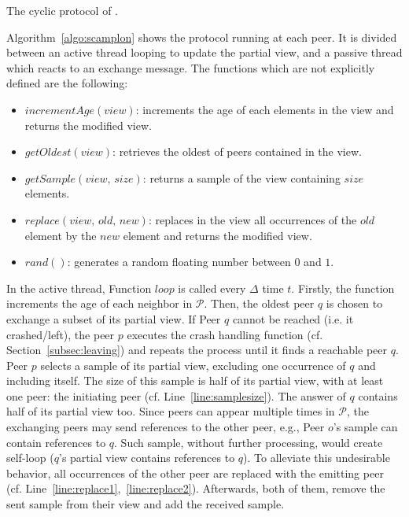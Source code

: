 \begin{algorithm}[h]
  
  \caption{\label{algo:scamplon}The cyclic protocol of \SPRAY.}
\end{algorithm}

Algorithm~\ref{algo:scamplon} shows the \SPRAY protocol running at each
peer. It is divided between an active thread looping to update the partial
view, and a passive thread which reacts to an exchange message. The functions
which are not explicitly defined are the following:
\begin{itemize}
\item $incrementAge(view)$: increments the age of each elements in the view
  and returns the modified view.
\item $getOldest(view)$: retrieves the oldest of peers contained in the view.
\item $getSample(view, \, size)$: returns a sample of the view containing
  $size$ elements.
\item $replace(view,\,old,\,new)$: replaces in the view all occurrences of
  the $old$ element by the $new$ element and returns the modified view.
\item $rand()$: generates a random floating number between $0$ and $1$.
\end{itemize}

In the active thread, Function $loop$ is called every $\Delta$ time
$t$. Firstly, the function increments the age of each neighbor in
$\mathcal{P}$. Then, the oldest peer $q$ is chosen to exchange a subset of its
partial view. If Peer $q$ cannot be reached (i.e. it crashed/left), the peer
$p$ executes the crash handling function (cf. Section~\ref{subsec:leaving}) and
repeats the process until it finds a reachable peer $q$. Peer $p$ selects a
sample of its partial view, excluding one occurrence of $q$ and including
itself. The size of this sample is half of its partial view, with at least one
peer: the initiating peer (cf. Line~\ref{line:samplesize}). The answer of $q$
contains half of its partial view too. Since peers can appear multiple times in
$\mathcal{P}$, the exchanging peers may send references to the other peer,
e.g., Peer $o$'s sample can contain references to $q$. Such sample, without
further processing, would create self-loop ($q$'s partial view contains
references to $q$). To alleviate this undesirable behavior, all occurrences of
the other peer are replaced with the emitting peer
(cf. Line~\ref{line:replace1},~\ref{line:replace2}).  Afterwards, both of them,
remove the sent sample from their view and add the received sample.


